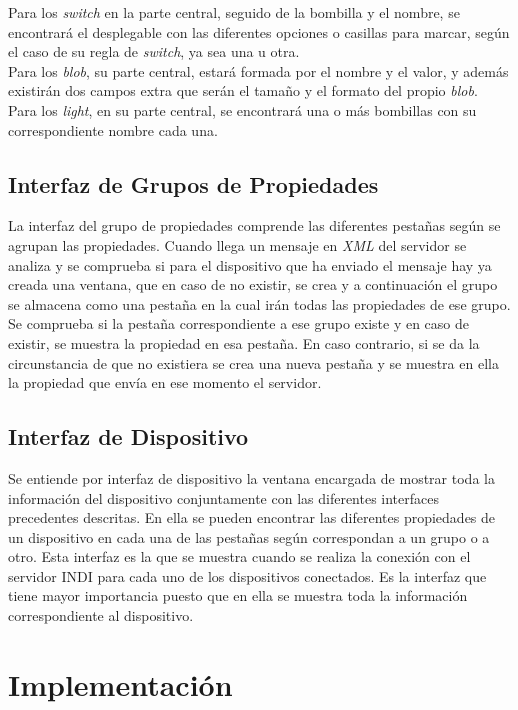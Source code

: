 Para los \textit{switch} en la parte central, seguido de la bombilla y el nombre, se encontrará el desplegable con las diferentes opciones o casillas para marcar, según el caso de  su regla de \textit{switch}, ya  sea una u otra.\\

Para los \textit{blob}, su parte central, estará formada por el nombre y el valor, y además existirán dos campos extra que serán el tamaño y el formato del propio \textit{blob}.\\

Para los \textit{light}, en su parte central, se encontrará una o más bombillas con su correspondiente nombre cada una.

\subsection{Interfaz de Grupos de Propiedades}
La interfaz del grupo de propiedades comprende las diferentes pestañas según se agrupan las propiedades. Cuando llega un mensaje en \textit{XML} del servidor se analiza y se comprueba si para el dispositivo que ha enviado el mensaje hay ya creada una ventana, que en caso de no existir, se crea y a continuación el grupo se almacena como una pestaña en la cual irán todas las propiedades de ese grupo.
Se comprueba si la pestaña correspondiente a ese grupo existe y en caso de existir, se muestra la propiedad en esa pestaña. En caso contrario, si se da la circunstancia de que no existiera se crea una nueva pestaña y se muestra en ella la propiedad que envía en ese momento el servidor.\\

\subsection{Interfaz de Dispositivo}
Se entiende por interfaz de dispositivo la ventana encargada de mostrar toda la información del dispositivo conjuntamente con las diferentes interfaces precedentes descritas. En ella se pueden encontrar las diferentes propiedades de un dispositivo en cada una de las pestañas según correspondan a un grupo o a otro. Esta interfaz es la que se muestra cuando se realiza la conexión con el servidor INDI para cada uno de los dispositivos conectados. Es la interfaz que tiene mayor importancia puesto que en ella se muestra toda la información correspondiente al dispositivo.


\section{Implementación}
